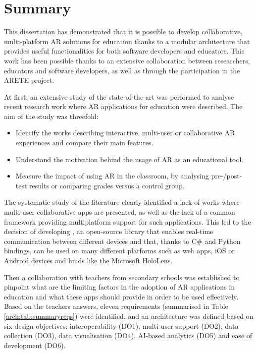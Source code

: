 \section{Summary}
This dissertation has demonstrated that it is possible to develop collaborative, multi-platform AR solutions for education thanks to a modular architecture that provides useful functionalities for both software developers and educators. This work has been possible thanks to an extensive collaboration between researchers, educators and software developers, as well as through the participation in the ARETE project. 

At first, an extensive study of the state-of-the-art was performed to analyse recent research work where AR applications for education were described. The aim of the study was threefold:
\begin{itemize}
    \item Identify the works describing interactive, multi-user or collaborative AR experiences and compare their main features.
    \item Understand the motivation behind the usage of AR as an educational tool.
    \item Measure the impact of using AR in the classroom, by analysing pre-/post- test results or comparing grades versus a control group.
\end{itemize}

The systematic study of the literature clearly identified a lack of works where multi-user collaborative apps are presented, as well as the lack of a common framework providing multiplatform support for such applications. This led to the decision of developing \ork{}, an open-source library that enables real-time communication between different devices and that, thanks to C\# and Python bindings, can be used on many different platforms such as web apps, iOS or Android devices and \glspl{hmd} like the Microsoft HoloLens.

Then a collaboration with teachers from secondary schools was established to pinpoint what are the limiting factors in the adoption of AR applications in education and what these apps should provide in order to be used effectively. Based on the teachers answers, eleven requirements (summarised in Table \ref{arch:tab:summaryreqs}) were identified, and an architecture was defined based on six design objectives: interoperability (DO1), multi-user support (DO2), data collection (DO3), data visualisation (DO4), AI-based analytics (DO5)
and ease of development (DO6).

